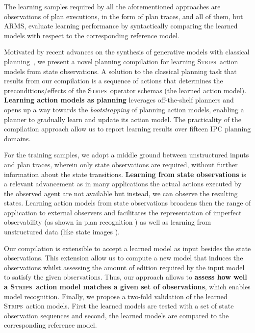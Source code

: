 \documentclass{article}
\newcommand{\strips}{\textsc{Strips}}     %
\begin{document}
The learning samples required by all the aforementioned approaches are observations of plan executions, in the form of plan traces, and all of them, but {\sc ARMS}, evaluate learning performance by syntactically comparing the learned models with respect to the corresponding reference model.


Motivated by recent advances on the synthesis of generative models with classical planning~\cite{bonet2009automatic,segovia2016hierarchical,segovia2017generating}, we present a novel planning compilation for learning \strips\ action models from state observations. A solution to the classical planning task that results from our compilation is a sequence of actions that determines the preconditions/effects of the \strips\ operator schemas (the learned action model). \textbf{Learning action models as planning} leverages off-the-shelf planners and opens up a way towards the \emph{bootstrapping} of planning action models, enabling a planner to gradually learn and update its action model. The practicality of the compilation approach allow us to report learning results over fifteen IPC planning domains.

For the training samples, we adopt a middle ground between unstructured inputs and plan traces, wherein only state observations are required, without further information about the state transitions. \textbf{Learning from state observations} is a relevant advancement as in many applications the actual actions executed by the observed agent are not available but instead, we can observe the resulting states. Learning action models from state observations broadens then the range of application to external observers and facilitates the representation of imperfect observability (as shown in plan recognition \cite{SohrabiRU16}) as well as learning from unstructured data (like state images \cite{AsaiF18}).

Our compilation is extensible to accept a learned model as input besides the state observations. This extension allow us to compute a new model that induces the observations whilst assessing the amount of edition required by the input model to satisfy the given observations. Thus, our approach allows to {\bf assess how well a \strips\ action model matches a given set of observations}, which enables model recognition. Finally, we propose a two-fold validation of the learned \strips\ action models. First the learned models are tested with a set of state observation sequences and second, the learned models are compared to the corresponding reference model.
\end{document}
